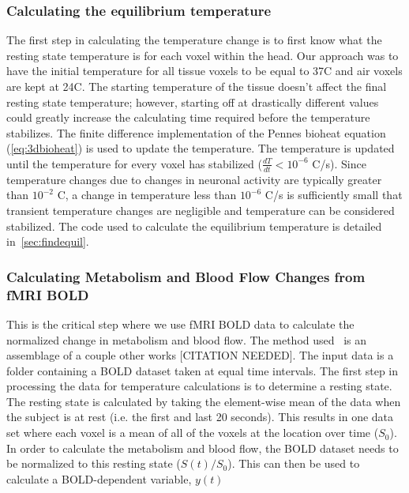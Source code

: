   
    \subsubsection{Calculating the equilibrium temperature}
  The first step in calculating the temperature change is to first know what the resting state temperature is for each voxel within the head. Our approach was to have the initial temperature for all tissue voxels to be equal to 37\degree C and air voxels are kept at 24\degree C.  The starting temperature of the tissue doesn't affect the final resting state temperature; however, starting off at drastically different values could greatly increase the calculating time required before the temperature stabilizes. The finite difference implementation of the Pennes bioheat equation (\cref{eq:3dbioheat}) is used to update the temperature.  The temperature is updated until the temperature for every voxel has stabilized ($\frac{dT}{dt} < 10^{-6}$ \degree C/s).  Since temperature changes due to changes in neuronal activity are typically greater than $10^{-2}$ \degree C, a change in temperature less than $10^{-6}$ \degree C/s is sufficiently small that transient temperature changes are negligible and temperature can be considered stabilized.  The code used to calculate the equilibrium temperature is detailed in~\cref{sec:findequil}.
  
    \subsubsection{Calculating Metabolism and Blood Flow Changes from fMRI BOLD}
    \label{sss:calcmf}
    This is the critical step where we use fMRI BOLD data to calculate the normalized change in metabolism and blood flow.  The method used~\cite{sotero2011} is an assemblage of a couple other works [CITATION NEEDED]. The input data is a folder containing a BOLD dataset taken at equal time intervals.  The first step in processing the data for temperature calculations is to determine a resting state.  The resting state is calculated by taking the element-wise mean of the data when the subject is at rest (i.e. the first and last 20 seconds).  This results in one data set where each voxel is a mean of all of the voxels at the location over time ($S_0$).  In order to calculate the metabolism and blood flow, the BOLD dataset needs to be normalized to this resting state ($S(t)/S_0$).  This can then be used to calculate a BOLD-dependent variable, $y(t)$


